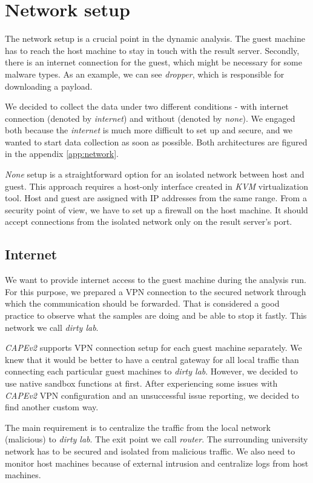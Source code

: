 \section{Network setup}
The network setup is a crucial point in the dynamic analysis. The guest machine has to reach the host machine to stay in touch with the result server. Secondly, there is an internet connection for the guest, which might be necessary for some malware types. As an example, we can see \emph{dropper}, which is responsible for downloading a payload.

We decided to collect the data under two different conditions - with internet connection (denoted by \emph{internet}) and without (denoted by \emph{none}). We engaged both because the \emph{internet} is much more difficult to set up and secure, and we wanted to start data collection as soon as possible. Both architectures are figured in the appendix \ref{app:network}.

\emph{None} setup is a straightforward option for an isolated network between host and guest. This approach requires a host-only interface created in \emph{KVM} virtualization tool. Host and guest are assigned with IP addresses from the same range. From a security point of view, we have to set up a firewall on the host machine. It should accept connections from the isolated network only on the result server's port.

\subsection{Internet}
We want to provide internet access to the guest machine during the analysis run. For this purpose, we prepared a VPN connection to the secured network through which the communication should be forwarded. That is considered a good practice to observe what the samples are doing and be able to stop it fastly. This network we call \emph{dirty lab}.

\emph{CAPEv2} supports VPN connection setup for each guest machine separately. We knew that it would be better to have a central gateway for all local traffic than connecting each particular guest machines to \emph{dirty lab}. However, we decided to use native sandbox functions at first. After experiencing some issues with \emph{CAPEv2} VPN configuration and an unsuccessful issue reporting, we decided to find another custom way. 

The main requirement is to centralize the traffic from the local network (malicious) to \emph{dirty lab}. The exit point we call \emph{router}. The surrounding university network has to be secured and isolated from malicious traffic. We also need to monitor host machines because of external intrusion and centralize logs from host machines.

